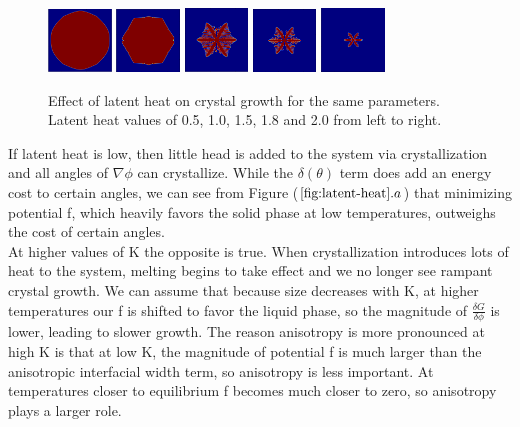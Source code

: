 \documentclass[10pt]{article} %
\begin{document}
\begin{figure}[h!]
  \centering
  \includegraphics[width=0.15\textwidth]{../F-0.5-10.png}
  \includegraphics[width=0.15\textwidth]{../F-1.0-10.png}
  \includegraphics[width=0.15\textwidth]{../F-1.5-10.png}
  \includegraphics[width=0.15\textwidth]{../F-1.8-10.png}
  \includegraphics[width=0.15\textwidth]{../F-2.5-10.png}
  \caption{Effect of latent heat on crystal growth for the same parameters. Latent heat values of 0.5, 1.0, 1.5, 1.8 and 2.0 from left to right.}
  \label{fig:latent-heat}
\end{figure}

If latent heat is low, then little head is added to the system via crystallization and all angles of $\nabla\phi$ can crystallize. While the $\delta(\theta)$ term does add an energy cost to certain angles, we can see from Figure ($\ref{fig:latent-heat}.a$) that minimizing potential f, which heavily favors the solid phase at low temperatures, outweighs the cost of certain angles.\\

At higher values of K the opposite is true. When crystallization introduces lots of heat to the system, melting begins to take effect and we no longer see rampant crystal growth. We can assume that because size decreases with K, at higher temperatures our f is shifted to favor the liquid phase, so the magnitude of $\frac{\delta G}{\delta\phi}$ is lower, leading to slower growth. The reason anisotropy is more pronounced at high K is that at low K, the magnitude of potential f is much larger than the anisotropic interfacial width term, so anisotropy is less important. At temperatures closer to equilibrium f becomes much closer to zero, so anisotropy plays a larger role.\\
\end{document}
